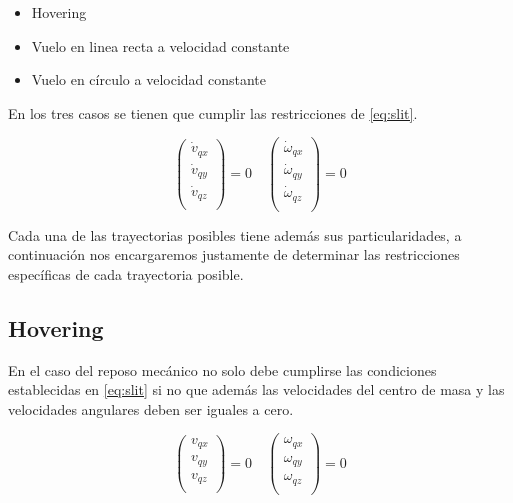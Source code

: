 \documentclass[main]{subfiles}
\begin{document}
\begin{itemize}
\item Hovering
\item Vuelo en linea recta a velocidad constante
\item Vuelo en c\'irculo a velocidad constante 
\end{itemize} 

En los tres casos se tienen que cumplir las restricciones de  \ref{eq:slit}.

\begin{equation}
\label{eq:slit}
\left(\begin{array}{c}
\dot{v}_{qx}\\
\dot{v}_{qy}\\
\dot{v}_{qz}\\
\end{array}\right)=0 \quad 
\left(\begin{array}{c}
\dot{\omega}_{qx}\\
\dot{\omega}_{qy}\\
\dot{\omega}_{qz}\\
\end{array}\right)=0
\end{equation}

Cada una de las trayectorias posibles tiene adem\'as sus particularidades, a continuaci\'on nos encargaremos justamente de determinar las restricciones espec\'ificas de cada trayectoria posible. 

\subsection{Hovering}
En el caso del reposo mec\'anico no solo debe cumplirse las condiciones establecidas en \ref{eq:slit} si no que adem\'as las velocidades del centro de masa y las velocidades angulares deben ser iguales a cero.

\begin{equation}
\label{eq:quieto}
\left(\begin{array}{c}
v_{qx}\\
v_{qy}\\
v_{qz}\\
\end{array}\right)=0 \quad
\left(\begin{array}{c}
\omega_{qx}\\
\omega_{qy}\\
\omega_{qz}\\
\end{array}\right)=0
\end{equation}
\end{document}
